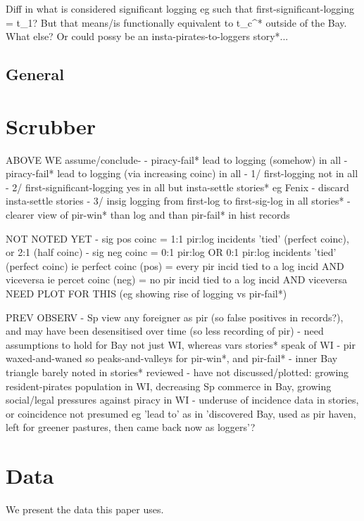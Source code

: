 \documentclass{amsart}
\theoremstyle{definition}
\theoremstyle{remark}
\begin{document}
		Diff in what is considered significant logging eg such that first-significant-logging = t_1? But that means/is functionally equivalent to t_c^* outside of the Bay. What else? Or could possy be an insta-pirates-to-loggers story*... 
	\subsection{General}
	\label{ss:general}
\section{Scrubber}
			ABOVE WE assume/conclude-
			- piracy-fail* lead to logging (somehow) in all
			- piracy-fail* lead to logging (via increasing coinc) in all
			- 1/ first-logging not in all
			- 2/ first-significant-logging yes in all but insta-settle stories* eg Fenix
			- discard insta-settle stories
			- 3/ insig logging from first-log to first-sig-log in all stories*
			- clearer view of pir-win* than log and than pir-fail* in hist records
			
			NOT NOTED YET
			- sig pos coinc = 1:1 pir:log incidents 'tied' (perfect coinc), or 2:1 (half coinc)
			- sig neg coinc = 0:1 pir:log OR 0:1 pir:log incidents 'tied' (perfect coinc)
			ie perfect coinc (pos) = every pir incid tied to a log incid AND viceversa
			ie percet coinc (neg) = no pir incid tied to a log incid AND viceversa
			NEED PLOT FOR THIS (eg showing rise of logging vs pir-fail*)

			PREV OBSERV
			- Sp view any foreigner as pir (so false positives in records?), and may have been desensitised over time (so less recording of pir)
			- need assumptions to hold for Bay not just WI, whereas vars stories* speak of WI
			- pir waxed-and-waned so peaks-and-valleys for pir-win*, and pir-fail*
			- inner Bay triangle barely noted in stories* reviewed
			- have not discussed/plotted: growing resident-pirates population in WI, decreasing Sp commerce in Bay, growing social/legal pressures against piracy in WI
			- underuse of incidence data in stories, or coincidence not presumed eg 'lead to' as in 'discovered Bay, used as pir haven, left for greener pastures, then came back now as loggers'?
%
%
%
\section{Data}
\label{s:data}
	We present the data this paper uses.
%
%
%
%
%
%
\begin{bibdiv}
\label{s:references}
	\begin{biblist}
	\end{biblist}
\end{bibdiv}
%
%
%
\end{document}
